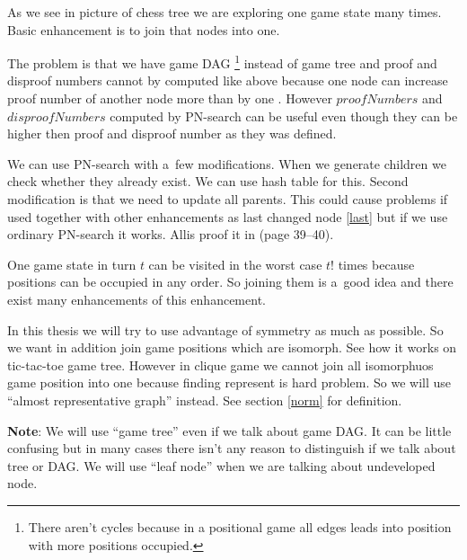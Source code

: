 As we see in picture  of chess tree we are exploring one
game state many times. Basic enhancement is to join that nodes into one.

The problem is that we have game DAG \footnote{There aren't cycles because in a
positional game all edges leads into position with more positions occupied.}
instead of game tree and proof and disproof numbers cannot by computed like
above because one node can increase proof number of another node more than by
one . However $proofNumbers$ and $disproofNumbers$ computed by
PN-search can be useful even though they can be higher then proof and disproof
number as they was defined. 

We can use PN-search with a~few modifications. When we generate children we
check whether they already exist. We can use hash table for this. Second
modification is that we need to update all parents. This could cause problems
if used together with other enhancements as last changed node \ref{last} but if
we use ordinary PN-search it works. Allis proof it in \cite{allis} (page
39--40).

One game state in turn $t$ can be visited in the worst case $t!$ times because
positions can be occupied in any order. So joining them is a~good idea and
there exist many enhancements of this enhancement.

In this thesis we will try to use advantage of symmetry as much as possible.
So we want in addition join game positions which are isomorph. See 
how it works on tic-tac-toe game tree. However in clique game we cannot join
all isomorphuos game position into one because finding  represent is hard problem. So we will use ``almost
representative graph''  instead. See section \ref{norm}
for definition.

\textbf{Note}: We will use ``game tree'' even if we talk about game DAG. It can be little confusing 
but in many cases there isn't any reason to distinguish if we talk about tree or DAG. 
We will use ``leaf node'' when we are talking about undeveloped node. 

